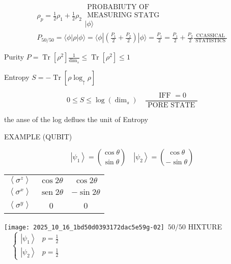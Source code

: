 $$
\begin{array}{r}
\rho_{p}=\frac{1}{2} \rho_{1}+\frac{1}{2} \rho_{2} \begin{array}{c}\text { PROBABIUTY OF } \\ \text { MEASURING STATG } \\ |\phi\rangle\end{array}
\\P_{50 / 50}=\langle\phi| \rho|\phi\rangle=\langle\phi|\left(\frac{P_{1}}{2}+\frac{P_{2}}{2}\right)|\phi\rangle=\frac{P_{1}}{2}=\frac{P_{1}}{2}+\frac{P_{2}}{2} \frac{\text { CCASSICAL }}{\text { STATISTICS }}
\end{array}
$$

Purity $P=\operatorname{Tr}\left[\rho^{2}\right] \frac{1}{\operatorname{dim}_{s}} \leqslant \operatorname{Tr}\left[\rho^{2}\right] \leqslant 1$

Entropy $S=-\operatorname{Tr}\left[\rho \log _{\uparrow} \rho\right]$

$$
0 \leqslant S \leqslant \log \left(\operatorname{dim}_{s}\right) \quad \frac{\text { IFF }=0}{\text { PORE STATE }}
$$

the anse of the log deflues the unit of Entropy

EXAMPLE (QUBIT)

$$
\left|\psi_{1}\right\rangle=\binom{\cos \theta}{\sin \theta} \quad\left|\psi_{2}\right\rangle=\binom{\cos \theta}{-\sin \theta}
$$

\begin{center}
\begin{tabular}{ccc}
$\left\langle\sigma^{z}\right\rangle$ & $\cos 2 \theta$ & $\cos 2 \theta$
\\
$\left\langle\sigma^{x}\right\rangle$ & $\operatorname{sen} 2 \theta$ & $-\sin 2 \theta$
\\
$\left\langle\sigma^{y}\right\rangle$ & 0 & 0
\end{tabular}
\end{center}

\texttt{[image: 2025\_10\_16\_1bd50d0393172dac5e59g-02]}\
$50 / 50$ HIXTURE $\quad \begin{cases}\left|\psi_{1}\right\rangle & p=\frac{1}{2} \\ \left|\psi_{2}\right\rangle & p=\frac{1}{2}\end{cases}$

